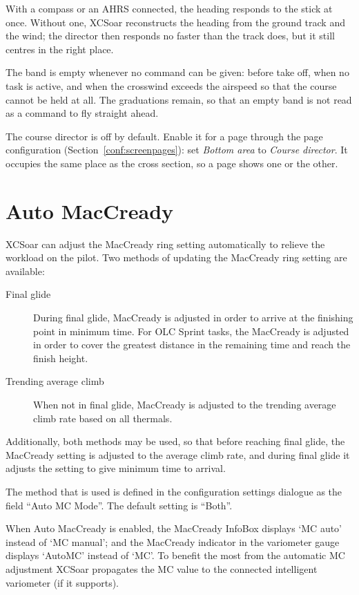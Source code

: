 With a compass or an AHRS connected, the heading responds to the stick
at once.  Without one, XCSoar reconstructs the heading from the ground
track and the wind; the director then responds no faster than the
track does, but it still centres in the right place.

The band is empty whenever no command can be given: before take off,
when no task is active, and when the crosswind exceeds the airspeed so
that the course cannot be held at all.  The graduations remain, so
that an empty band is not read as a command to fly straight ahead.

The course director is off by default.  Enable it for a page through
the page configuration (Section~\ref{conf:screenpages}): set
\emph{Bottom area} to \emph{Course director}.  It occupies the same
place as the cross section, so a page shows one or the other.


\section{Auto MacCready}\label{sec:auto-maccready}

XCSoar can adjust the MacCready ring setting automatically to relieve the
workload on the pilot.  Two methods of updating the MacCready ring setting
are available:
\begin{description}
\item[Final glide]  During final glide, MacCready is adjusted in order to
 arrive at the finishing point in minimum time.  For OLC Sprint tasks,
 the MacCready is adjusted in order to cover the greatest distance in the remaining
 time and reach the finish height.
\item[Trending average climb] When not in final glide, MacCready is adjusted
to the trending average climb rate based on all thermals.
\end{description}
Additionally, both methods may be used, so that before reaching final glide,
the MacCready setting is adjusted to the average climb rate, and during final
glide it adjusts the setting to give minimum time to arrival.

The method that is used is defined in the configuration settings dialogue as the
field ``Auto MC Mode''.  The default setting is ``Both''.

When Auto MacCready is enabled, the MacCready InfoBox displays `MC auto'
instead of `MC manual'; and the MacCready indicator in the variometer
gauge displays `AutoMC' instead of `MC'.
To benefit the most from the automatic MC adjustment XCSoar propagates the MC
value to the connected intelligent variometer (if it supports).

